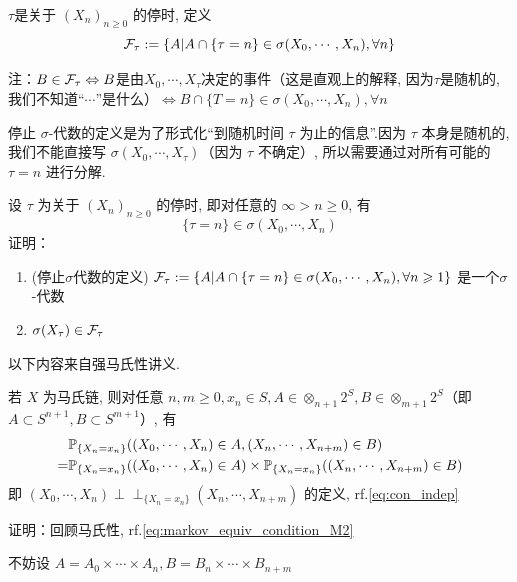 \begin{definition}[停止$\sigma$代数]
    $\tau$是关于 $(X_n)_{n\geq 0}$ 的停时, 定义
    \[
    \mathcal{F}_{\tau}:=\{A|A\cap\{\tau=n\}\in\sigma(X_0,\cdots,X_n),\forall n\}
    \]
\end{definition}

注：$B\in \mathcal{F}_{\tau}\Leftrightarrow B$是由$X_0,\cdots,X_{\tau}$决定的事件（这是直观上的解释, 因为$\tau$是随机的, 我们不知道“$\cdots$”是什么）$ \Leftrightarrow B\cap\{T=n\}\in \sigma(X_0,\cdots,X_n),\forall n$

停止 $\sigma$-代数的定义是为了形式化“到随机时间 $\tau$ 为止的信息”.因为 $\tau$ 本身是随机的, 我们不能直接写 $\sigma(X_0,\cdots,X_{\tau})$（因为 $\tau$ 不确定）, 所以需要通过对所有可能的 $\tau=n$ 进行分解.

\begin{problem}[作业5-2]
设 $\tau$ 为关于 $(X_n)_{n\geq 0}$ 的停时, 即对任意的 $\infty>n\geq 0$, 有
\[
\{\tau=n\}\in\sigma(X_0,\cdots,X_n)
\]
证明：
\begin{enumerate}
\item (停止$\sigma$代数的定义) $\mathcal{F}_{\tau}:=\{A|A\cap \{\tau=n\}\in \sigma(X_0,\cdots,X_n),\forall n\geqslant 1\}$ 是一个$\sigma$-代数
\item $\sigma(X_{\tau})\in \mathcal{F}_{\tau}$
\end{enumerate}
\end{problem}

以下内容来自强马氏性讲义\cite{handout_SMP}.

\begin{lemma}[马氏性的小推广]\label{lem:markov_extend}
若 \( X \) 为马氏链, 则对任意 \( n,m \geq 0, x_n \in S, A \in \otimes_{n+1}2^S, B \in \otimes_{m+1}2^S \)（即 \( A \subset S^{n+1}, B \subset S^{m+1} \)）, 有
\begin{equation}
\begin{aligned}
&\mathbb{P}_{\{X_n=x_n\}}((X_0, \cdots , X_n) \in A, (X_n, \cdots , X_{n+m}) \in B)\\
=&\mathbb{P}_{\{X_n=x_n\}}((X_0, \cdots , X_n) \in A) \times \mathbb{P}_{\{X_n=x_n\}}((X_n, \cdots , X_{n+m}) \in B)
\end{aligned}
\label{eq:markov_extend}
\end{equation}
即 \((X_0, \cdots , X_n) \perp \!\!\! \perp_{\{X_n=x_n\}} (X_n, \cdots , X_{n+m})\) 的定义, rf.\eqref{eq:con_indep}
\end{lemma}

证明：回顾马氏性, rf.\eqref{eq:markov_equiv_condition_M2}

不妨设 \( A = A_0 \times \cdots \times A_n, B = B_n \times \cdots \times B_{n+m} \)

